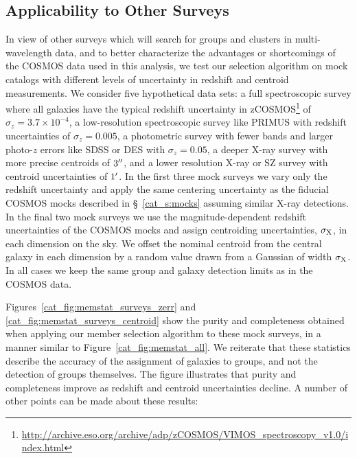 \subsection{Applicability to Other Surveys}
\label{cat_s:surveys}

In view of other surveys which will search for groups and clusters in
multi-wavelength data, and to better characterize the advantages or
shortcomings of the COSMOS data used in this analysis, we test our
selection algorithm on mock catalogs with different levels of
uncertainty in redshift and centroid measurements. We consider five
hypothetical data sets: a full spectroscopic survey where all galaxies
have the typical redshift uncertainty in
zCOSMOS\footnote{\url{http://archive.eso.org/archive/adp/zCOSMOS/VIMOS\_spectroscopy\_v1.0/index.html}}
of $\sigma_z=3.7\times10^{-4}$, a low-resolution spectroscopic survey
like PRIMUS \citep{Coil2010} with redshift uncertainties of
$\sigma_z=0.005$, a photometric survey with fewer bands and larger
photo-$z$ errors like SDSS \citep{Csabai2003} or DES \citep{Banerji2008}
with $\sigma_z=0.05$, a deeper X-ray survey with more precise
centroids of  $3\mbox{$^{\prime\prime}$}$, and a lower resolution X-ray or SZ survey with centroid
uncertainties of $1\mbox{$^\prime$}$. In the first three mock surveys we vary
only the redshift uncertainty and apply the same centering uncertainty
as the fiducial COSMOS mocks described in \S~\ref{cat_s:mocks} assuming
similar X-ray detections. In the
final two mock surveys we use the magnitude-dependent redshift
uncertainties of the COSMOS mocks and assign centroiding
uncertainties, $\sigma_{\rm X}$, in each dimension on the sky. We
offset the nominal centroid from the central galaxy in each dimension
by a random value drawn from a Gaussian of width $\sigma_{\rm X}$. In all
cases we keep the same group and galaxy detection limits as in the
COSMOS data.

Figures~\ref{cat_fig:memstat_surveys_zerr} and
\ref{cat_fig:memstat_surveys_centroid} show the purity and completeness 
obtained when applying our member selection algorithm to these mock
surveys, in a manner similar to Figure~\ref{cat_fig:memstat_all}. We
reiterate that these statistics describe the accuracy of 
the assignment of galaxies to groups, and not the detection of groups
themselves. The figure illustrates that purity and completeness
improve as redshift and centroid uncertainties decline. A number of
other points can be made about these results:

